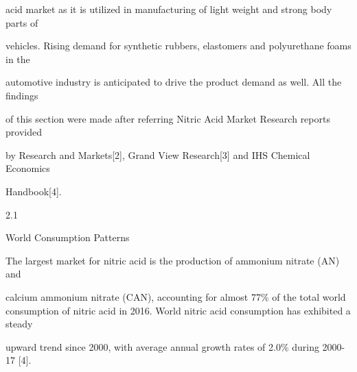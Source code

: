 \documentclass[a4paper,portrait,12pt]{article}
\begin{document}
\begin{flushleft}
acid market as it is utilized in manufacturing of light weight and strong body parts of
\end{flushleft}


\begin{flushleft}
vehicles. Rising demand for synthetic rubbers, elastomers and polyurethane foams in the
\end{flushleft}


\begin{flushleft}
automotive industry is anticipated to drive the product demand as well. All the findings
\end{flushleft}


\begin{flushleft}
of this section were made after referring Nitric Acid Market Research reports provided
\end{flushleft}


\begin{flushleft}
by Research and Markets[2], Grand View Research[3] and IHS Chemical Economics
\end{flushleft}


\begin{flushleft}
Handbook[4].
\end{flushleft}





2.1





\begin{flushleft}
World Consumption Patterns
\end{flushleft}





\begin{flushleft}
The largest market for nitric acid is the production of ammonium nitrate (AN) and
\end{flushleft}


\begin{flushleft}
calcium ammonium nitrate (CAN), accounting for almost 77\% of the total world consumption of nitric acid in 2016. World nitric acid consumption has exhibited a steady
\end{flushleft}


\begin{flushleft}
upward trend since 2000, with average annual growth rates of 2.0\% during 2000-17 [4].
\end{flushleft}
\end{document}
